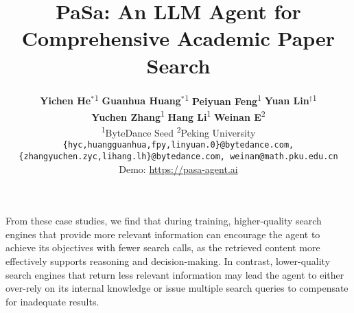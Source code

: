 From these case studies, we find that during training, higher-quality search engines that provide more relevant information can encourage the agent to achieve its objectives with fewer search calls, as the retrieved content more effectively supports reasoning and decision-making. 
In contrast, lower-quality search engines that return less relevant information may lead the agent to either over-rely on its internal knowledge or issue multiple search queries to compensate for inadequate results. 




\title{PaSa: An LLM Agent for Comprehensive Academic Paper Search}

\begin{comment}
\author{First Author \\
  Affiliation / Address line 1 \\
  Affiliation / Address line 2 \\
  Affiliation / Address line 3 \\
  \texttt{email@domain} \\\And
  Second Author \\
  Affiliation / Address line 1 \\
  Affiliation / Address line 2 \\
  Affiliation / Address line 3 \\
  \texttt{email@domain} \\}
\end{comment}

\author{
   \textbf{Yichen He$^*$}\textsuperscript{1}\quad
   \textbf{Guanhua Huang$^*$}\textsuperscript{1}  \quad
   \textbf{Peiyuan Feng}\textsuperscript{1} \quad
   \textbf{Yuan Lin$^\dagger$}\textsuperscript{1}\\[0.1cm]
   \textbf{Yuchen Zhang}\textsuperscript{1}\quad
   \textbf{Hang Li}\textsuperscript{1}\quad
   \textbf{Weinan E}\textsuperscript{2}\\[0.3cm]
   \textsuperscript{1}ByteDance Seed \quad \textsuperscript{2}Peking University\quad \\[0.3cm]
   \texttt{\{hyc,huangguanhua,fpy,linyuan.0\}@bytedance.com,}\\
   \texttt{\{zhangyuchen.zyc,lihang.lh\}@bytedance.com, weinan@math.pku.edu.cn}\\[0.3cm]
   Demo: \url{https://pasa-agent.ai}\\
}


\maketitle

